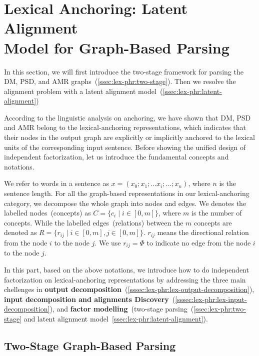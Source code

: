 \section[Lexical Anchoring: Latent Alignment Model for Graph-Based
Parsing]{Lexical Anchoring: Latent Alignment \\Model for Graph-Based Parsing}
\label{sec:lex-phr:graph-based}

In this section, we will first introduce the two-stage framework for parsing
the DM, PSD, and AMR graphs~(\autoref{ssec:lex-phr:two-stage}). Then we
resolve the alignment problem with a latent alignment model~(\autoref{ssec:lex-phr:latent-alignment})


According to the linguistic analysis on anchoring, we have shown that
DM, PSD and AMR belong to the lexical-anchoring representations, which indicates that
their nodes in the output graph are explicitly or implicitly anchored
to the lexical units of the corresponding input sentence.  Before
showing the unified design of independent factorization, let us
introduce the fundamental concepts and notations.

We refer to words in a sentence as
$x=(x_{0};x_{1};...x_{i};...;x_{n})$, where $n$ is the sentence
length.  For all the graph-based representations in our
lexical-anchoring category, we decompose the whole graph into nodes
and edges. We denotes the labelled nodes~(concepts) as
$C = \{c_{i}\mid i \in [0,m]\}$, where $m$ is the number of concepts.
While the labelled edges~(relations) between the $m$ concepts are
denoted as $R = \{r_{ij}\mid i \in [0, m], j \in [0, m]\}$.  $r_{ij}$ means
the directional relation from the node $i$ to the node $j$.  We use
$r_{ij}=\Phi$ to indicate no edge from the node $i$ to the node $j$.

In this part, based on the above notations, we introduce how to do
independent factorization on lexical-anchoring representations by addressing the three
main chellenges in \textbf{output
  decomposition}~(\autoref{sssec:lex-phr:lex-output-decomposition}),
\textbf{input decomposition and alignments
  Discovery}~(\autoref{sssec:lex-phr:lex-input-decomposition}), and
\textbf{factor modelling}~(two-stage
parsing~(\autoref{ssec:lex-phr:two-stage} and latent alignment
model~\autoref{ssec:lex-phr:latent-alignment}).



\subsection{Two-Stage Graph-Based Parsing}
\label{ssec:lex-phr:two-stage}


